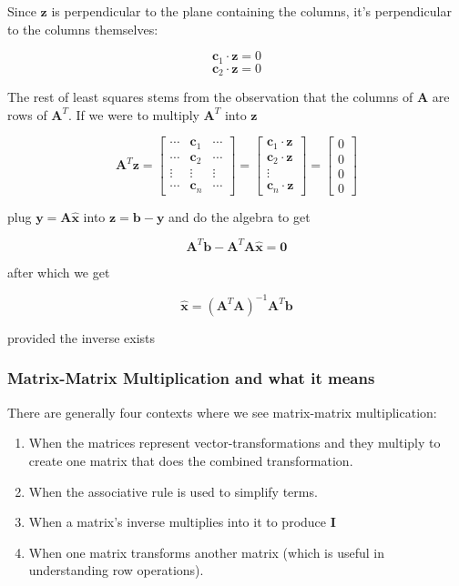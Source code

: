 \documentclass[main.tex]{subfiles}
\begin{document}
    Since $\mathbf{z}$ is perpendicular to the plane containing the columns, it's perpendicular to the columns themselves:
    
    $$\mathbf{c}_{1} \cdot \mathbf{z}=0$$
    $$\mathbf{c}_{2} \cdot \mathbf{z}=0$$
    
    The rest of least squares stems from the observation that the columns of $\mathbf{A}$ are rows of $\mathbf{A}^{T}$. If we were to multiply $\mathbf{A}^{T}$ into $\mathbf{z}$
    
    $$\mathbf{A}^{T} \mathbf{z}=\left[\begin{array}{ccc}\cdots & \mathbf{c}_{1} & \cdots \\ \cdots & \mathbf{c}_{2} & \cdots \\ \vdots & \vdots & \vdots \\ \cdots & \mathbf{c}_{n} & \cdots\end{array}\right]=\left[\begin{array}{c}\mathbf{c}_{1} \cdot \mathbf{z} \\ \mathbf{c}_{2} \cdot \mathbf{z} \\ \vdots \\ \mathbf{c}_{n} \cdot \mathbf{z}\end{array}\right]=\left[\begin{array}{l}0 \\ 0 \\ 0 \\ 0\end{array}\right]$$
    
    plug $\mathbf{y}=\mathbf{A} \hat{\mathbf{x}}$ into $\mathbf{z}=\mathbf{b}-\mathbf{y}$ and do the algebra to get 
    
    $$\mathbf{A}^{T} \mathbf{b}-\mathbf{A}^{T} \mathbf{A} \hat{\mathbf{x}}=\mathbf{0}$$
    
    after which we get
    
    $$\hat{\mathbf{x}}=\left(\mathbf{A}^{T} \mathbf{A}\right)^{-1} \mathbf{A}^{T} \mathbf{b}$$
    
    provided the inverse exists
    
    \subsubsection{Matrix-Matrix Multiplication and what it means}
    
    There are generally four contexts where we see matrix-matrix multiplication:
    
    \begin{enumerate}
        \item When the matrices represent vector-transformations and they multiply to create one matrix that does the combined transformation.
        \item When the associative rule is used to simplify terms.
        \item When a matrix's inverse multiplies into it to produce $\mathbf{I}$
        \item When one matrix transforms another matrix (which is useful in understanding row operations).
    \end{enumerate}
    
\end{document}
